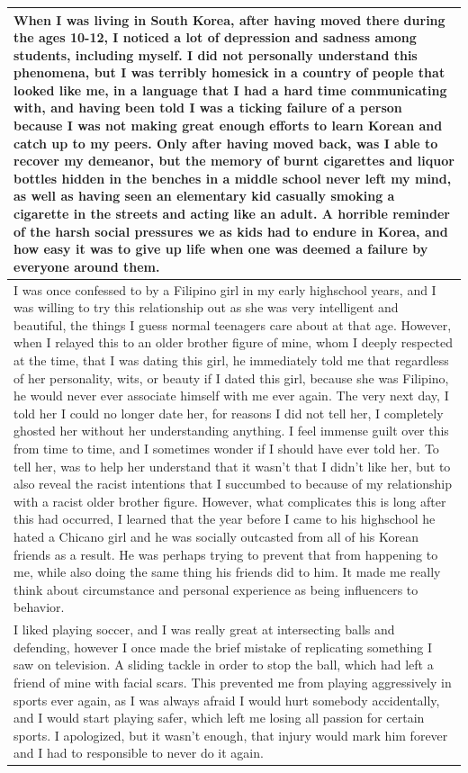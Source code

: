 \documentclass[
  .7em,
  letterpaper,
  DIV=11,
  numbers=noendperiod]{scrartcl}
\begin{document}
\begin{table}
\begin{tabular}{l}
\hline
When I was living in South Korea, after having moved there during the ages 10-12, I noticed a lot of depression and sadness among students, including myself. I did not personally understand this phenomena, but I was terribly homesick in a country of people that looked like me, in a language that I had a hard time communicating with, and having been told I was a ticking failure of a person because I was not making great enough efforts to learn Korean and catch up to my peers. Only after having moved back, was I able to recover my demeanor, but the memory of burnt cigarettes and liquor bottles hidden in the benches in a middle school never left my mind, as well as having seen an elementary kid casually smoking a cigarette in the streets and acting like an adult. A horrible reminder of the harsh social pressures we as kids had to endure in Korea, and how easy it was to give up life when one was deemed a failure by everyone around them.\\
\hline
I was once confessed to by a Filipino girl in my early highschool years, and I was willing to try this relationship out as she was very intelligent and beautiful, the things I guess normal teenagers care about at that age. However, when I relayed this to an older brother figure of mine, whom I deeply respected at the time, that I was dating this girl, he immediately told me that regardless of her personality, wits, or beauty if I dated this girl, because she was Filipino, he would never ever associate himself with me ever again. The very next day, I told her I could no longer date her, for reasons I did not tell her, I completely ghosted her without her understanding anything. I feel immense guilt over this from time to time, and I sometimes wonder if I should have ever told her. To tell her, was to help her understand that it wasn't that I didn't like her, but to also reveal the racist intentions that I succumbed to because of my relationship with a racist older brother figure. However, what complicates this is long after this had occurred, I learned that the year before I came to his highschool he hated a Chicano girl and he was socially outcasted from all of his Korean friends as a result. He was perhaps trying to prevent that from happening to me, while also doing the same thing his friends did to him. It made me really think about circumstance and personal experience as being influencers to behavior.\\
\hline
I liked playing soccer, and I was really great at intersecting balls and defending, however I once made the brief mistake of replicating something I saw on television. A sliding tackle in order to stop the ball, which had left a friend of mine with facial scars. This prevented me from playing aggressively in sports ever again, as I was always afraid I would hurt somebody accidentally, and I would start playing safer, which left me losing all passion for certain sports. I apologized, but it wasn't enough, that injury would mark him forever and I had to responsible to never do it again.\\

\end{tabular}
\end{table}
\end{document}
